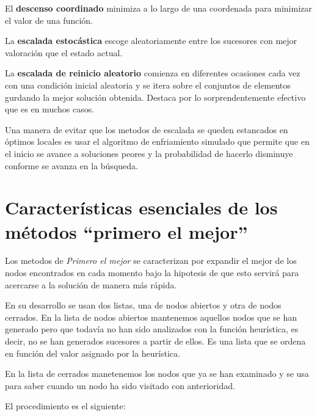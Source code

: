 \documentclass[12pt]{article}
\begin{document}
El \textbf{descenso coordinado} minimiza a lo largo de una coordenada
para minimizar el valor de una función.

La \textbf{escalada estocástica} escoge aleatoriamente entre los
sucesores con mejor valoración que el estado actual.

La \textbf{escalada de reinicio aleatorio} comienza en diferentes
ocasiones cada vez con una condición inicial aleatoria y se itera
sobre el conjuntos de elementos gurdando la mejor solución obtenida.
Destaca por lo sorprendentemente efectivo que es en muchos casos.

Una manera de evitar que los metodos de escalada se queden estancados
en óptimos locales es usar el algoritmo de enfriamiento simulado que
permite que en el inicio se avance a soluciones peores y la
probabilidad de hacerlo disminuye conforme se avanza en la búsqueda.


\section{Características esenciales de los métodos “primero el mejor”}

Los metodos de \textit{Primero el mejor} se caracterizan por expandir
el mejor de los nodos encontrados en cada momento bajo la hipotesis de
que esto servirá para acercarse a la solución de manera más rápida.

En su desarrollo se usan dos listas, una de nodos abiertos y otra de
nodos cerrados. En la lista de nodos abiertos mantenemos aquellos
nodos que se han generado pero que todavía no han sido analizados con
la función heurística, es decir, no se han generados sucesores a
partir de ellos. Es una lista que se ordena en función del valor
asignado por la heurística.


En la lista de cerrados manetenemos los nodos que ya se han examinado
y se usa para saber cuando un nodo ha sido visitado con anterioridad.

El procedimiento es el siguiente:
\end{document}
